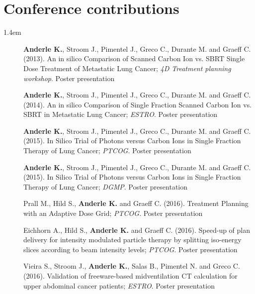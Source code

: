 \section*{Conference contributions}
\begin{setlength}{\leftmargini}{1.4em}
  \begin{description}
    \item[] \textbf{Anderle K.}, Stroom J., Pimentel J., Greco C., Durante M. and Graeff C. (2013). An in silico Comparison of Scanned Carbon Ion vs. SBRT Single Dose Treatment of Metastatic Lung Cancer; \textit{4D Treatment planning workshop}. Poster presentation
    \item[] \textbf{Anderle K.}, Stroom J., Pimentel J., Greco C., Durante M. and Graeff C. (2014). An in silico Comparison of Single Fraction Scanned Carbon Ion vs. SBRT in Metastatic Lung Cancer; \textit{ESTRO}. Poster presentation
    \item[] \textbf{Anderle K.}, Stroom J., Pimentel J., Greco C., Durante M. and Graeff C. (2015). In Silico Trial of Photons versus Carbon Ions in Single Fraction Therapy of Lung Cancer; \textit{PTCOG}. Poster presentation
    \item[] \textbf{Anderle K.}, Stroom J., Pimentel J., Greco C., Durante M. and Graeff C. (2015). In Silico Trial of Photons versus Carbon Ions in Single Fraction Therapy of Lung Cancer; \textit{DGMP}. Poster presentation
    \item[]  Prall M., Hild S., \textbf{Anderle K.} and Graeff C. (2016). Treatment Planning with an Adaptive Dose Grid; \textit{PTCOG}. Poster presentation
    \item[]  Eichhorn A., Hild S., \textbf{Anderle K.} and Graeff C. (2016). Speed-up of plan delivery for intensity modulated particle therapy by splitting iso-energy slices according to beam intensity levels; \textit{PTCOG}. Poster presentation
    \item[]  Vieira S., Stroom J., \textbf{Anderle K.}, Salas B., Pimentel N. and Greco C. (2016). Validation of freeware-based midventilation CT calculation for upper abdominal cancer patients; \textit{ESTRO}. Poster presentation
    
    
    
      \end{description}
\end{setlength}




% 